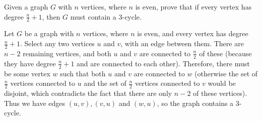 \question Given a graph $G$ with $n$ vertices, where $n$ is even, 
prove that if every vertex has degree $\frac{n}{2}+1$, then $G$ 
must contain a 3-cycle. 

\begin{solution}[2in]
Let $G$ be a graph with $n$ vertices, where $n$ is even, and every 
vertex has degree $\frac{n}{2} + 1$. Select any two vertices $u$ and 
$v$, with an edge between them. There are $n - 2$ remaining vertices, 
and both $u$ and $v$ are connected to $\frac{n}{2}$ of these (because 
they have degree $\frac{n}{2} + 1$ and are connected to each other). 
Therefore, there must be some vertex $w$ such that both $u$ and $v$ 
are connected to $w$ (otherwise the set of $\frac{n}{2}$ vertices 
connected to $u$ and the set of $\frac{n}{2}$ vertices connected to 
$v$ would be disjoint, which contradicts the fact that there are only 
$n - 2$ of these vertices). Thus we have edges $(u, v), (v, u)$ and 
$(w, u)$, so the graph contains a 3-cycle.

\end{solution}